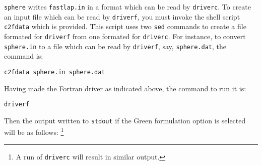 {\tt sphere} writes {\tt fastlap.in} in a format which can be read
by {\tt driverc}.  To create an input file which can be read by 
{\tt driverf}, you must invoke the shell script {\tt c2fdata} which
is provided.  This script uses two {\tt sed} commands to create a
file formated for {\tt driverf} from one formated for {\tt driverc}.
For instance, to convert {\tt sphere.in} to a file which can be read 
by {\tt driverf}, say, {\tt sphere.dat}, the command is:

{\tt c2fdata sphere.in sphere.dat}

Having made the Fortran driver as indicated above, the command to run it is:

{\tt driverf}

\noindent
Then the output written to {\tt stdout} if the Green formulation option is
selected will be as follows:
\footnote{
A run of {\tt driverc} will result in similar output.
}
\vfill\break
